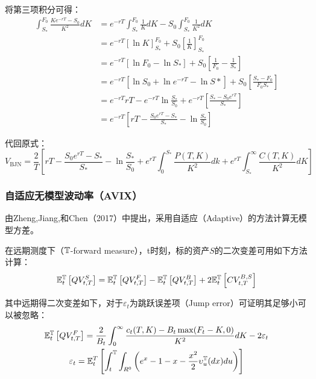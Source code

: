 \documentclass[11pt]{article}
\begin{document}
将第三项积分可得：
\begin{align*}
    \int_{S_*}^{F_0} \frac{K e^{-rT} - S_0 }{K^2} dK &= e^{-rT} \int_{S_*}^{F_0} \frac{1}{K} dK - S_0 \int_{S_*}^{F_0} \frac{1}{K^2} dK \\
    &= e^{-rT} \left[ \ln K \right]_{S_*}^{F_0} + S_0 \left[ \frac{1}{K}  \right]_{S_*}^{F_0} \\
    &= e^{-rT} \left[ \ln F_0 - \ln S_* \right] + S_0 \left[ \frac{1}{F_0} - \frac{1}{S_*} \right] \\
    &= e^{-rT} \left[\ln S_0 + \ln e^{-rT} - \ln S* \right] + S_0 \left[ \frac{S_* - F_0}{F_0 S_*} \right] \\
    &= e^{-rT} rT - e^{-rT} \ln \frac{S_*}{S_0} + e^{-rT}\left[ \frac{S_* - S_0 e^{rT}}{S_*} \right] \\
    &= e^{-rT} \left[ rT - \frac{S_0 e^{rT} - S_*}{S_*} - \ln \frac{S_*}{S_0} \right]
\end{align*}

代回原式：
\begin{equation*}
    V_{\text{BJN}} = \frac{2}{T} \left[ rT - \frac{S_0 e^{rT} - S_*}{S_*} - \ln \frac{S_*}{S_0} + e^{rT} \int_{0}^{S_*} \frac{P(T,K)}{K^2} dk + e^{rT} \int_{S_*}^{\infty} \frac{C(T,K)}{K^2} dK \right] 
\end{equation*}

\subsubsection{自适应无模型波动率（AVIX）}

由Zheng,Jiang,和Chen（2017）中提出，采用自适应（Adaptive）的方法计算无模型方差。

在远期测度下（$\mathbb{T}$-forward measure），t时刻，标的资产$S$的二次变差可用如下方法计算：
\begin{equation*}
    \mathbb{E}_{t}^{\mathbb{T}}\left[ QV_{t,T}^S \right] = 
    \mathbb{E}_{t}^{\mathbb{T}}\left[ QV_{t,T}^F \right] - \mathbb{E}_{t}^{\mathbb{T}}\left[ QV_{t,T}^B \right] + 2 \mathbb{E}_{t}^{\mathbb{T}}\left[ CV_{t,T}^{B,S} \right]
\end{equation*}

其中远期得二次变差如下，对于$\varepsilon_t$为跳跃误差项（Jump error）可证明其足够小可以被忽略：
\begin{gather*}
    \mathbb{E}_{t}^{\mathbb{T}}\left[ QV_{t,T}^F \right] = \frac{2}{B_t} \int_{0}^{\infty} \frac{c_t(T,K) - B_t \max(F_t -K,0)}{K^2} dK - 2\varepsilon_t \\
    \varepsilon_t = \mathbb{E}_{t}^{T} \left[ \int_{t}^{\mathbb{T}} \int_{R^0} \left( e^x - 1 -x - \frac{x^2}{2} \upsilon_{u}^{\mathbb{T}}(dx)du \right) \right]
\end{gather*}
\end{document}
